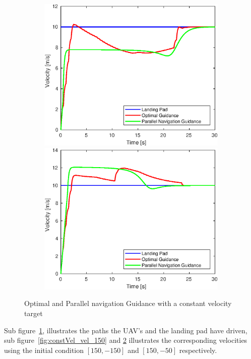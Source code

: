 \begin{figure}[h!]
\begin{subfigure}{.5\textwidth}
		\label{fig:constVel}
	\end{subfigure}%
	\begin{subfigure}{.5\textwidth}
		\centering
		\includegraphics[width=\linewidth]{img/plot/simulation/constant_vel_two_init_vel_150.eps}
		\label{fig:constVel_vel_150}
		\includegraphics[width=\linewidth]{img/plot/simulation/constant_vel_two_init_vel_50.eps}
		\label{fig:constVel_vel_50}
	\end{subfigure}
	\caption{Optimal and Parallel navigation Guidance with a constant velocity target}\label{fig:constant_vel_target}
\end{figure}
Sub figure~\ref{fig:constVel}, illustrates the paths the UAV's and the landing pad have driven, sub figure~\ref{fig:constVel_vel_150} and \ref{fig:constVel_vel_50} illustrates the corresponding velocities using the initial condition $[150,-150]$ and $[150,-50]$ respectively.

